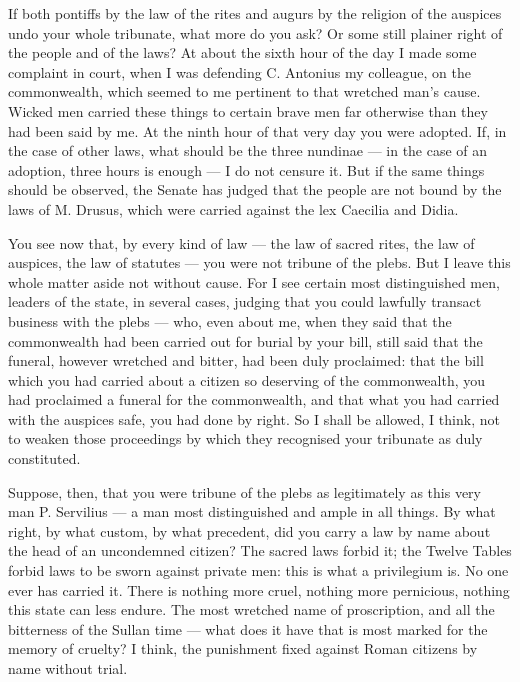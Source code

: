  If both pontiffs by the law of the rites and augurs by the religion of the auspices undo your whole tribunate, what more do you ask? Or some still plainer right of the people and of the laws? At about the sixth hour of the day I made some complaint in court, when I was defending C. Antonius my colleague, on the commonwealth, which seemed to me pertinent to that wretched man's cause. Wicked men carried these things to certain brave men far otherwise than they had been said by me. At the ninth hour of that very day you were adopted. If, in the case of other laws, what should be the three nundinae --- in the case of an adoption, three hours is enough --- I do not censure it. But if the same things should be observed, the Senate has judged that the people are not bound by the laws of M. Drusus, which were carried against the lex Caecilia and Didia.

 You see now that, by every kind of law --- the law of sacred rites, the law of auspices, the law of statutes --- you were not tribune of the plebs. But I leave this whole matter aside not without cause. For I see certain most distinguished men, leaders of the state, in several cases, judging that you could lawfully transact business with the plebs --- who, even about me, when they said that the commonwealth had been carried out for burial by your bill, still said that the funeral, however wretched and bitter, had been duly proclaimed: that the bill which you had carried about a citizen so deserving of the commonwealth, you had proclaimed a funeral for the commonwealth, and that what you had carried with the auspices safe, you had done by right. So I shall be allowed, I think, not to weaken those proceedings by which they recognised your tribunate as duly constituted.

 Suppose, then, that you were tribune of the plebs as legitimately as this very man P. Servilius --- a man most distinguished and ample in all things. By what right, by what custom, by what precedent, did you carry a law by name about the head of an uncondemned citizen? The sacred laws forbid it; the Twelve Tables forbid laws to be sworn against private men: this is what a privilegium is. No one ever has carried it. There is nothing more cruel, nothing more pernicious, nothing this state can less endure. The most wretched name of proscription, and all the bitterness of the Sullan time --- what does it have that is most marked for the memory of cruelty? I think, the punishment fixed against Roman citizens by name without trial.

